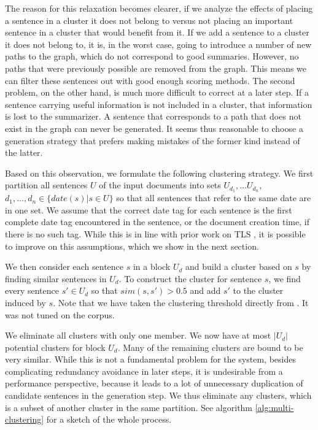 \documentclass[a4paper,BCOR=10mm]{report}
\numberwithin{lemma}{chapter}
\numberwithin{definition}{chapter}
\begin{document}
The reason for this relaxation becomes clearer, if we analyze the effects of placing a sentence in a cluster it does not belong to versus not placing an important sentence in a cluster that would benefit from it.
If we add a sentence to a cluster it does not belong to, it is, in the worst case, going to introduce a number of new paths to the graph, which do not correspond to good summaries. However, no paths that were previously possible are removed from the graph. This means we can filter these sentences out with good enough scoring methods.
The second problem, on the other hand, is much more difficult to correct at a later step. If a sentence carrying useful information is not included in a cluster, that information is lost to the summarizer. A sentence that corresponds to a path that does not exist in the graph can never be generated. It seems thus reasonable to choose a generation strategy that prefers making mistakes of the former kind instead of the latter.

Based on this observation, we formulate the following clustering strategy. We first partition all sentences $U$ of the input documents into sets $U_{d_1}, \dots U_{d_n}$, $d_1, \dots, d_n \in \{ date(s) | s \in U \}$ so that all sentences that refer to the same date are in one set. We assume that the correct date tag for each sentence is the first complete date tag encountered in the sentence, or the document creation time, if there is no such tag. While this is in line with prior work on TLS \citep{chieu, markert}, it is possible to improve on this assumptions, which we show in the next section.

We then consider each sentence $s$ in a block $U_d$ and build a cluster based on $s$ by finding similar sentences in $U_d$.
To construct the cluster for sentence $s$, we find every sentence $s' \in U_d$ so that $\mathit{sim}(s, s') > 0.5$ and add $s'$ to the cluster induced by $s$. Note that we have taken the clustering threshold directly from \citet{banerjee}. It was not tuned on the corpus.

We eliminate all clusters with only one member. We now have at most $|U_d|$ potential clusters for block $U_d$.
Many of the remaining clusters are bound to be very similar. While this is not a fundamental problem for the system, besides complicating redundancy avoidance in later steps, it is undesirable from a performance perspective, because it leads to a lot of unnecessary duplication of candidate sentences in the generation step.
We thus eliminate any clusters, which is a subset of another cluster in the same partition. See algorithm \ref{alg:multi-clustering} for a sketch of the whole process.
\end{document}
